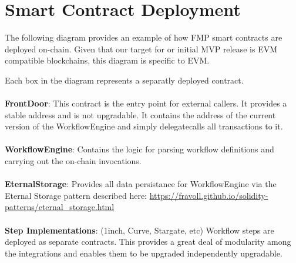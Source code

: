 \documentclass[oneside]{article}
\begin{document}
\section*{Smart Contract Deployment}

The following diagram provides an example of how FMP smart contracts are deployed on-chain.  Given that our target for or initial MVP release is EVM compatible blockchains, this diagram is specific to EVM.

\begin{center}
\end{center}

\noindent Each box in the diagram represents a separatly deployed contract.
\\
\\
\noindent \textbf{FrontDoor}:  This contract is the entry point for external callers.  It provides a stable address and is not upgradable.  
It contains the address of the current version of the  WorkflowEngine and simply delegatecalls all transactions to it.
\\
\\
\noindent \textbf{WorkflowEngine}:  Contains the logic for parsing workflow definitions and carrying out the on-chain invocations.
\\
\\
\noindent \textbf{EternalStorage}:  Provides all data persistance for WorkflowEngine via the Eternal Storage pattern described here: \url{https://fravoll.github.io/solidity-patterns/eternal_storage.html}
\\
\\
\noindent \textbf{Step Implementations}:  (1inch, Curve, Stargate, etc) Workflow steps are deployed as separate contracts.  
This provides a great deal of modularity among the integrations and enables them to be upgraded independently upgradable. 
\end{document}
